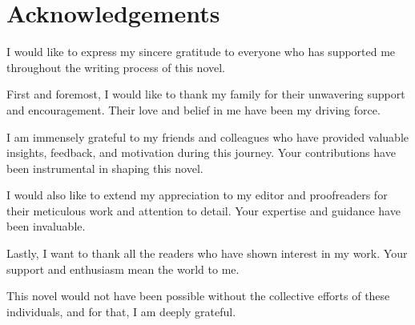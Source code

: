\chapter*{Acknowledgements}

I would like to express my sincere gratitude to everyone who has supported me throughout the writing process of this novel. 

First and foremost, I would like to thank my family for their unwavering support and encouragement. Their love and belief in me have been my driving force.

I am immensely grateful to my friends and colleagues who have provided valuable insights, feedback, and motivation during this journey. Your contributions have been instrumental in shaping this novel.

I would also like to extend my appreciation to my editor and proofreaders for their meticulous work and attention to detail. Your expertise and guidance have been invaluable.

Lastly, I want to thank all the readers who have shown interest in my work. Your support and enthusiasm mean the world to me.

This novel would not have been possible without the collective efforts of these individuals, and for that, I am deeply grateful.
